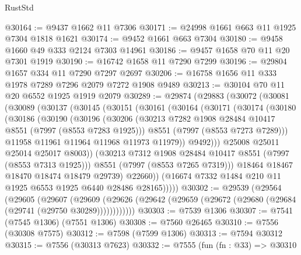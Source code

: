 \begin{lexlean}{RustStd}
\begin{coremodule}
{\begin{coremodule}
{{{{{{{{{{{{{{{{{{{{{{{{{{{{{{{{{{{{{{{{{{{@30164 := @9437 @1662 @11 @7306
@30171 := @24998 @1661 @663 @11 @1925 @7304 @1818 @1621
@30174 := @9452 @1661 @663 @7304
@30180 := @9458 @1660 @49 @333 @2124 @7303 @14961
@30186 := @9457 @1658 @70 @11 @20 @7301 @1919
@30190 := @16742 @1658 @11 @7290 @7299
@30196 := @29804 @1657 @334 @11 @7290 @7297 @2697
@30206 := @16758 @1656 @11 @333 @1978 @7289 @7296 @2079 @7272 @1908 @9489
@30213 := @30104 @70 @11 @20 @6552 @1925 @1919 @2079
@30289 := @29874
    (@29883
      (@30072
        (@30081
          (@30089
            (@30137
              (@30145
                (@30151
                  (@30161
                    (@30164
                      (@30171
                        (@30174
                          (@30180
                            (@30186
                              (@30190
                                (@30196
                                  (@30206
                                    (@30213
                                      @7282
                                      @1908
                                      @28484
                                      @10417
                                      @8551
                                      (@7997 (@8553 @7283 @1925)))
                                    @8551
                                    (@7997 (@8553 @7273 @7289)))
                                  @11958
                                  @11961
                                  @11964
                                  @11968
                                  @11973
                                  @11979))
                              @9492)))
                        @25008
                        @25011
                        @25014
                        @25017
                        @8003))
                    (@30213 @7312 @1908 @28484 @10417 @8551 (@7997 (@8553 @7313 @1925)))
                    @8551
                    (@7997 (@8553 @7265 @7319)))
                  @18464
                  @18467
                  @18470
                  @18474
                  @18479
                  @29739)
                @22660))
            (@16674 @7332 @1484 @210 @11 @1925 @6553 @1925 @6440 @28486 @28165)))))
@30302 := @29539
    (@29564
      (@29605
        (@29607
          (@29609 (@29626 (@29642 (@29659 (@29672 (@29680 (@29684 (@29741 (@29750 @30289))))))))))))
@30303 := @7539 @1306
@30307 := @7541 (@7545 @1306) (@7551 @1306)
@30308 := @7560 @26465
@30310 := @7556 (@30308 @7575)
@30312 := @7598 (@7599 @1306)
@30313 := @7594 @30312
@30315 := @7556 (@30313 @7623)
@30332 := @7555
    (fun (fn : @33) =>
    @30310
}}}}}}}}}}}}}}}}}}}}}}}}}}}}}}}}}}}}}}}}}}}
\end{coremodule}}
\end{coremodule}
\end{lexlean}
